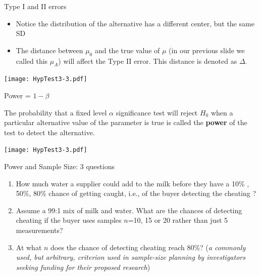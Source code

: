\documentclass[10pt]{beamer}\usepackage[]{graphicx}\usepackage[]{color}
\begin{document}
\begin{frame}[fragile]{Type I and II errors}
	\small
	\begin{itemize}
		\item Notice the distribution of the alternative has a different center, but the same SD  \pause 
		\item The distance between $\mu_0$ and the true value of $\mu$ (in our previous slide we called this $\mu_A$) will affect the Type II error. This distance is denoted as $\Delta$.
	\end{itemize}
	
	
	\centering
	\texttt{[image: HypTest3-3.pdf]}
	
	
	
\end{frame}


\begin{frame}[fragile]{Power = $1 - \beta$}
	
	\vspace*{-0.2in}
	
	\begin{definition}[Power = $1-\beta$]
		The probability that a fixed level $\alpha$ significance test will reject $H_0$ when a particular alternative value of the parameter is true is called the \textbf{power} of the test to detect the alternative. 
	\end{definition}
	
	
	\vspace*{-0.08in}
	
	\centering
	\texttt{[image: HypTest3-3.pdf]}
	
	
\end{frame}




\begin{frame}{Power and Sample Size: 3 questions}
	
	\begin{enumerate}
		\setlength\itemsep{1em}
		\item How much water a supplier could add to the milk before they have a 10\% , 50\%, 80\%
		chance of getting caught, i.e., of the buyer detecting the cheating ? \pause
		\item Assume a 99:1 mix of milk and water. What are the chances of detecting cheating if the buyer uses samples $n$=10, 15 or 20 rather than just 5 measurements? \pause
		\item At what $n$ does the chance of detecting cheating reach 80\%? (\textit{a commonly used, but arbitrary, criterion used in sample-size planning by investigators seeking funding for their proposed research})
	\end{enumerate}
	
\end{frame}
\end{document}
